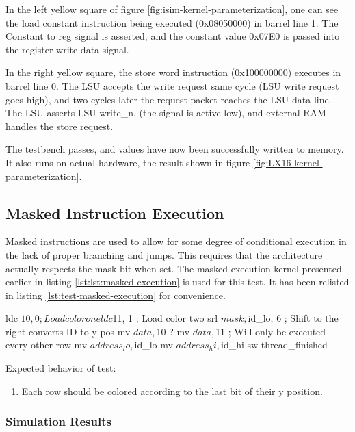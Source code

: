 \documentclass[../main/report.tex]{subfiles}
\begin{document}
In the left yellow square of figure \ref{fig:isim-kernel-parameterization}, one can see the load constant instruction being executed (0x08050000) in barrel line 1.
The Constant to reg signal is asserted, and the constant value 0x07E0 is passed into the register write data signal.

In the right yellow square, the store word instruction (0x100000000) executes in barrel line 0.
The LSU accepts the write request same cycle (LSU write request goes high), and two cycles later the request packet reaches the LSU data line.
The LSU asserts LSU write\_n, (the signal is active low), and external RAM handles the store request.

The testbench passes, and values have now been successfully written to memory.
It also runs on actual hardware, the result shown in figure \ref{fig:LX16-kernel-parameterization}.

\subsection{Masked Instruction Execution}

Masked instructions are used to allow for some degree of conditional execution in the lack of proper branching and jumps.
This requires that the architecture actually respects the mask bit when set.
The masked execution kernel presented earlier in listing \ref{lst:lst:masked-execution} is used for this test.
It has been relisted in listing \ref{lst:test-masked-execution} for convenience.

\begin{assembly}[caption=Conditional execution using predicated instructions, label=lst:test-masked-execution]
ldc $10, 0 ; Load color one
ldc $11, 1 ; Load color two
srl $mask, $id_lo, 6 ; Shift to the right converts ID to y pos
mv $data, $10
? mv $data, $11 ; Will only be executed every other row
mv $address_lo, $id_lo
mv $address_hi, $id_hi
sw
thread_finished
\end{assembly}

Expected behavior of test:
\begin{enumerate}
  \item
    Each row should be colored according to the last bit of their y position.
\end{enumerate}

\subsubsection*{Simulation Results}
\end{document}
